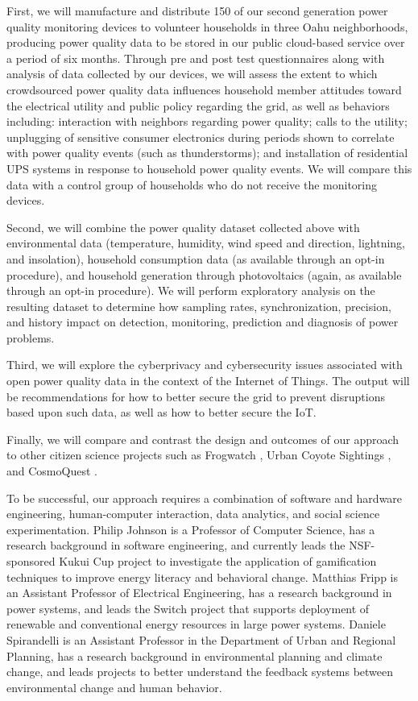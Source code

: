 First, we will manufacture and distribute 150 of our second generation power quality monitoring devices to volunteer households in three Oahu neighborhoods, producing power quality data to be stored in our public cloud-based service over a period of six months. Through pre and post test questionnaires along with analysis of data collected by our devices, we will assess the extent to which crowdsourced power quality data influences household member attitudes toward the electrical utility and public policy regarding the grid, as well as behaviors including: interaction with neighbors regarding power quality; calls to the utility; unplugging of sensitive consumer electronics during periods shown to correlate with power quality events (such as thunderstorms); and installation of residential UPS systems in response to household power quality events.  We will compare this data with a control group of households who do not receive the monitoring devices. 

Second, we will combine the power quality dataset collected above with environmental data (temperature, humidity, wind speed and direction, lightning, and insolation), household consumption data (as available through an opt-in procedure), and household generation through photovoltaics (again, as available through an opt-in procedure).  We will perform exploratory analysis on the resulting dataset to determine how sampling rates, synchronization, precision, and history impact on detection, monitoring, prediction and diagnosis of power problems.

Third, we will explore the cyberprivacy and cybersecurity issues associated with open power quality data in the context of the Internet of Things.  The output will be recommendations for how to better secure the grid to prevent disruptions based upon such data, as well as how to better secure the IoT.

Finally, we will compare and contrast the design and outcomes of our approach to other citizen science projects such as Frogwatch \cite{frogwatch}, Urban Coyote Sightings \cite{urbancoyote}, and CosmoQuest \cite{cosmoquest}.

To be successful, our approach requires a combination of software and hardware engineering, human-computer interaction, data analytics, and social science experimentation.  Philip Johnson is a Professor of Computer Science, has a research background in software engineering, and currently leads the NSF-sponsored Kukui Cup project \cite{kukuicup} to investigate the application of gamification techniques to improve energy literacy and behavioral change. Matthias Fripp is an Assistant Professor of Electrical Engineering, has a research background in power systems, and leads the Switch project \cite{switch} that supports deployment of renewable and conventional energy resources in large power systems. Daniele Spirandelli is an Assistant Professor in the Department of Urban and Regional Planning, has a research background in environmental planning and climate change, and leads projects to better understand the feedback systems between environmental change and human behavior. 

